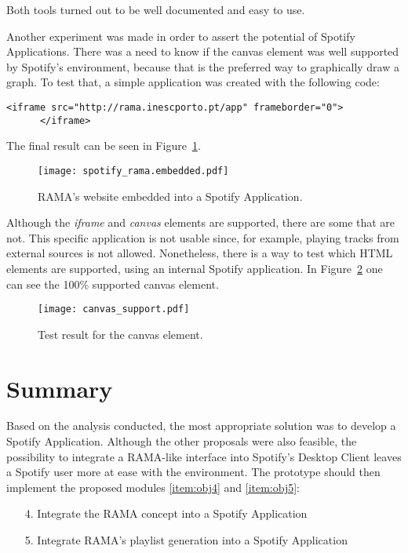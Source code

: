     Both tools turned out to be well documented and easy to use.

    \clearpage

    Another experiment was made in order to assert the potential of Spotify Applications.
    There was a need to know if the canvas element was well supported by Spotify's environment, because that is the preferred way to graphically draw a graph.
    To test that, a simple application was created with the following code:

    \begin{lstlisting}[caption={\emph{iframe} element that allows to embed RAMA's website into the application.}, style=htmlcssjs, captionpos=b]
      <iframe src="http://rama.inescporto.pt/app" frameborder="0">
      </iframe>\end{lstlisting}

    The final result can be seen in Figure~\ref{fig:rama_spotifyed}.
    \begin{figure}[H]
      \begin{center}
        \texttt{[image: spotify\_rama.embedded.pdf]}
      \end{center}
      \caption{RAMA's website embedded into a Spotify Application.}
      \label{fig:rama_spotifyed}
    \end{figure}
    Although the \emph{iframe} and \emph{canvas} elements are supported, there are some that are not.
    This specific application is not usable since, for example, playing tracks from external sources is not allowed.
    Nonetheless, there is a way to test which HTML elements are supported, using an internal Spotify application.
    In Figure~\ref{fig:canvas_support} one can see the 100\% supported canvas element.

    \begin{figure}[H]
       \begin{center}
         \texttt{[image: canvas\_support.pdf]}
       \end{center}
       \caption{Test result for the canvas element.}
       \label{fig:canvas_support}
     \end{figure}



\section{Summary}

  Based on the analysis conducted, the most appropriate solution was to develop a Spotify Application.
  Although the other proposals were also feasible, the possibility to integrate a RAMA-like interface into Spotify's Desktop Client leaves a Spotify user more at ease with the environment.
  The prototype should then implement the proposed modules \ref{item:obj4} and \ref{item:obj5}:

  \begin{itemize}
    \item[4.] Integrate the RAMA concept into a Spotify Application
    \item[5.] Integrate RAMA's playlist generation into a Spotify Application
  \end{itemize}
